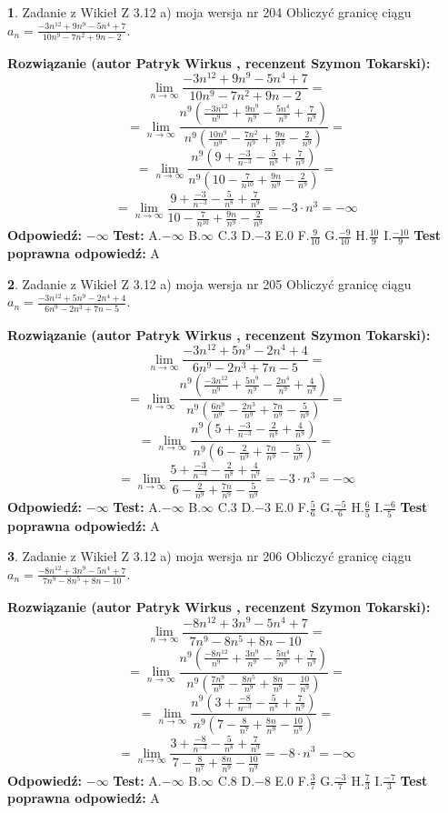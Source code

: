 \documentclass[12pt, a4paper]{article}
\theoremstyle{definition} %
\newtheorem{zad}{}
\newcommand{\zadStart}[1]{\begin{zad}#1\newline}
\newcommand{\zadStop}{\end{zad}}
\newcommand{\rozwStart}[2]{\noindent \textbf{Rozwiązanie (autor #1 , recenzent #2): }\newline}
\newcommand{\rozwStop}{\newline}
\newcommand{\odpStart}{\noindent \textbf{Odpowiedź:}\newline}
\newcommand{\odpStop}{\newline}
\newcommand{\testStart}{\noindent \textbf{Test:}\newline}
\newcommand{\testStop}{\newline}
\newcommand{\kluczStart}{\noindent \textbf{Test poprawna odpowiedź:}\newline}
\newcommand{\kluczStop}{\newline}
\begin{document}
\zadStart{Zadanie z Wikieł Z 3.12 a) moja wersja nr 204}
Obliczyć granicę ciągu $a_{n}=\frac{-3n^{12}+9n^{9}-5n^{4}+7}{10n^{9}-7n^{2}+9n-2}$.
\zadStop
\rozwStart{Patryk Wirkus}{Szymon Tokarski}
$$\lim\limits_{n\to\infty}\frac{-3n^{12}+9n^{9}-5n^{4}+7}{10n^{9}-7n^{2}+9n-2}=$$
$$=\lim\limits_{n\to\infty}\frac{n^{9}\left(\frac{-3n^{12}}{n^{9}}+\frac{9n^{9}}{n^{9}}-\frac{5n^{4}}{n^{9}}+\frac{7}{n^{9}}\right)}{n^{9}\left(\frac{10n^{9}}{n^{9}}-\frac{7n^{2}}{n^{9}}+\frac{9n}{n^{9}}-\frac{2}{n^{9}}\right)}=$$
$$=\lim\limits_{n\to\infty}\frac{n^{9}\left(9+\frac{-3}{n^{-3}}-\frac{5}{n^{8}}+\frac{7}{n^{9}}\right)}
{n^{9}\left(10-\frac{7}{n^{10}}+\frac{9n}{n^{9}}-\frac{2}{n^{9}}\right)}=$$
$$=\lim\limits_{n\to\infty}\frac{9+\frac{-3}{n^{-3}}-\frac{5}{n^{8}}+\frac{7}{n^{9}}}{10-\frac{7}{n^{10}}+\frac{9n}{n^{9}}-\frac{2}{n^{9}}}=-3\cdot n^{3} = -\infty$$
\rozwStop
\odpStart
$-\infty$
\odpStop
\testStart
A.$-\infty$
B.$\infty$
C.$3$
D.$-3$
E.$0$
F.$\frac{9}{10}$
G.$\frac{-9}{10}$
H.$\frac{10}{9}$
I.$\frac{-10}{9}$
\testStop
\kluczStart
A
\kluczStop



\zadStart{Zadanie z Wikieł Z 3.12 a) moja wersja nr 205}
Obliczyć granicę ciągu $a_{n}=\frac{-3n^{12}+5n^{9}-2n^{4}+4}{6n^{9}-2n^{3}+7n-5}$.
\zadStop
\rozwStart{Patryk Wirkus}{Szymon Tokarski}
$$\lim\limits_{n\to\infty}\frac{-3n^{12}+5n^{9}-2n^{4}+4}{6n^{9}-2n^{3}+7n-5}=$$
$$=\lim\limits_{n\to\infty}\frac{n^{9}\left(\frac{-3n^{12}}{n^{9}}+\frac{5n^{9}}{n^{9}}-\frac{2n^{4}}{n^{9}}+\frac{4}{n^{9}}\right)}{n^{9}\left(\frac{6n^{9}}{n^{9}}-\frac{2n^{3}}{n^{9}}+\frac{7n}{n^{9}}-\frac{5}{n^{9}}\right)}=$$
$$=\lim\limits_{n\to\infty}\frac{n^{9}\left(5+\frac{-3}{n^{-3}}-\frac{2}{n^{8}}+\frac{4}{n^{9}}\right)}
{n^{9}\left(6-\frac{2}{n^{9}}+\frac{7n}{n^{9}}-\frac{5}{n^{9}}\right)}=$$
$$=\lim\limits_{n\to\infty}\frac{5+\frac{-3}{n^{-3}}-\frac{2}{n^{8}}+\frac{4}{n^{9}}}{6-\frac{2}{n^{9}}+\frac{7n}{n^{9}}-\frac{5}{n^{9}}}=-3\cdot n^{3} = -\infty$$
\rozwStop
\odpStart
$-\infty$
\odpStop
\testStart
A.$-\infty$
B.$\infty$
C.$3$
D.$-3$
E.$0$
F.$\frac{5}{6}$
G.$\frac{-5}{6}$
H.$\frac{6}{5}$
I.$\frac{-6}{5}$
\testStop
\kluczStart
A
\kluczStop



\zadStart{Zadanie z Wikieł Z 3.12 a) moja wersja nr 206}
Obliczyć granicę ciągu $a_{n}=\frac{-8n^{12}+3n^{9}-5n^{4}+7}{7n^{9}-8n^{5}+8n-10}$.
\zadStop
\rozwStart{Patryk Wirkus}{Szymon Tokarski}
$$\lim\limits_{n\to\infty}\frac{-8n^{12}+3n^{9}-5n^{4}+7}{7n^{9}-8n^{5}+8n-10}=$$
$$=\lim\limits_{n\to\infty}\frac{n^{9}\left(\frac{-8n^{12}}{n^{9}}+\frac{3n^{9}}{n^{9}}-\frac{5n^{4}}{n^{9}}+\frac{7}{n^{9}}\right)}{n^{9}\left(\frac{7n^{9}}{n^{9}}-\frac{8n^{5}}{n^{9}}+\frac{8n}{n^{9}}-\frac{10}{n^{9}}\right)}=$$
$$=\lim\limits_{n\to\infty}\frac{n^{9}\left(3+\frac{-8}{n^{-3}}-\frac{5}{n^{8}}+\frac{7}{n^{9}}\right)}
{n^{9}\left(7-\frac{8}{n^{7}}+\frac{8n}{n^{9}}-\frac{10}{n^{9}}\right)}=$$
$$=\lim\limits_{n\to\infty}\frac{3+\frac{-8}{n^{-3}}-\frac{5}{n^{8}}+\frac{7}{n^{9}}}{7-\frac{8}{n^{7}}+\frac{8n}{n^{9}}-\frac{10}{n^{9}}}=-8\cdot n^{3} = -\infty$$
\rozwStop
\odpStart
$-\infty$
\odpStop
\testStart
A.$-\infty$
B.$\infty$
C.$8$
D.$-8$
E.$0$
F.$\frac{3}{7}$
G.$\frac{-3}{7}$
H.$\frac{7}{3}$
I.$\frac{-7}{3}$
\testStop
\kluczStart
A
\kluczStop
\end{document}
